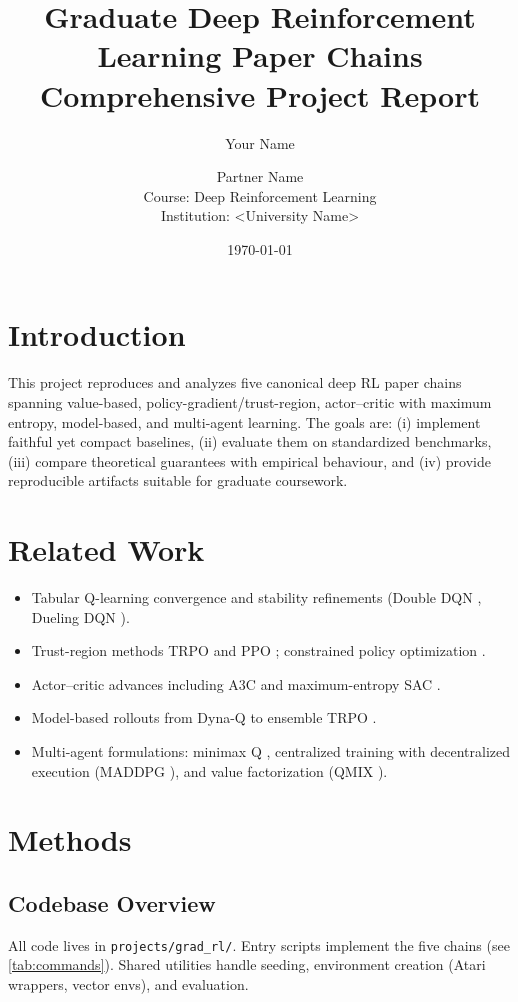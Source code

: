 \documentclass[12pt]{article}
\title{Graduate Deep Reinforcement Learning Paper Chains\\Comprehensive Project Report}
\author{Your Name \and Partner Name\\Course: Deep Reinforcement Learning\\Institution: <University Name>}
\date{\today}
\newcommand{\code}[1]{\texttt{#1}}
\begin{document}
\maketitle
\tableofcontents
\listoftables
\listoffigures

\section{Introduction}
This project reproduces and analyzes five canonical deep RL paper chains spanning value-based, policy-gradient/trust-region, actor--critic with maximum entropy, model-based, and multi-agent learning. The goals are: (i) implement faithful yet compact baselines, (ii) evaluate them on standardized benchmarks, (iii) compare theoretical guarantees with empirical behaviour, and (iv) provide reproducible artifacts suitable for graduate coursework.

\section{Related Work}
\begin{itemize}[leftmargin=*]
    \item Tabular Q-learning convergence \cite{watkins1992} and stability refinements (Double DQN \cite{vanhasselt2016double}, Dueling DQN \cite{wang2016dueling}).
    \item Trust-region methods TRPO \cite{schulman2015trpo} and PPO \cite{schulman2017ppo}; constrained policy optimization \cite{achiam2017cpo}.
    \item Actor--critic advances including A3C \cite{mnih2016a3c} and maximum-entropy SAC \cite{haarnoja2018sac}.
    \item Model-based rollouts from Dyna-Q \cite{sutton1990dyna} to ensemble TRPO \cite{kurutach2018metrpo}.
    \item Multi-agent formulations: minimax Q \cite{littman1994}, centralized training with decentralized execution (MADDPG \cite{lowe2017maddpg}), and value factorization (QMIX \cite{rashid2018qmix}).
\end{itemize}

\section{Methods}
\subsection{Codebase Overview}
All code lives in \code{projects/grad\_rl/}. Entry scripts implement the five chains (see \cref{tab:commands}). Shared utilities handle seeding, environment creation (Atari wrappers, vector envs), and evaluation.
\end{document}
